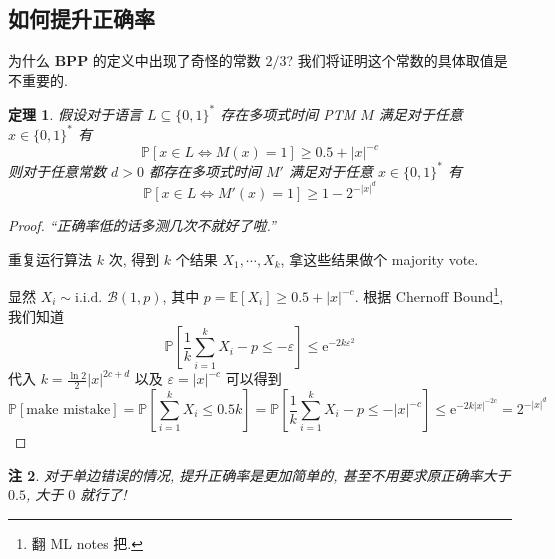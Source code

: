 \documentclass[8pt]{article}
\theoremstyle{compact}
\newtheorem{theorem}{定理}[section]
\newtheorem{remark}[theorem]{注}
\def\le{\leqslant}
\def\ge{\geqslant}
\def\BPP{\textbf{BPP}}
\begin{document}
\subsection{如何提升正确率}
为什么 $\BPP$ 的定义中出现了奇怪的常数 $2/3$? 我们将证明这个常数的具体取值是不重要的.
\begin{theorem}
	假设对于语言 $L \subseteq \{0, 1\}^*$ 存在多项式时间 PTM $M$ 满足对于任意 $x \in \{0, 1\}^*$ 有 $$\mathbb P[x \in L \Leftrightarrow M(x) = 1] \ge 0.5 + |x|^{-c}$$ 则对于任意常数 $d > 0$ 都存在多项式时间 $M'$ 满足对于任意 $x \in \{0, 1\}^*$ 有 $$\mathbb P[x \in L \Leftrightarrow M'(x) = 1] \ge 1 - 2^{-|x|^d}$$
	\label{robustness}
\end{theorem}
\begin{proof}
	\textit{“正确率低的话多测几次不就好了啦.”}

	重复运行算法 $k$ 次, 得到 $k$ 个结果 $X_1, \cdots, X_k$, 拿这些结果做个 majority vote.
	
	显然 $X_i \sim \text{i.i.d. } \mathcal B(1, p)$, 其中 $p = \mathbb E[X_i] \ge 0.5 + |x|^{-c}$. 根据 Chernoff Bound\footnote{翻 ML notes 把.}, 我们知道 $$\mathbb P\left[ \frac{1}{k}\sum_{i=1}^kX_i - p \le -\varepsilon \right] \le \mathrm{e}^{-2k\varepsilon^2}$$ 代入 $k = \frac{\ln 2}{2}|x|^{2c+d}$ 以及 $\varepsilon = |x|^{-c}$ 可以得到 $$\mathbb P[\text{make mistake}] = \mathbb P\left[ \sum_{i=1}^{k}X_i \le 0.5k\right] = \mathbb P\left[ \frac{1}{k}\sum_{i=1}^kX_i - p \le -|x|^{-c} \right] \le \mathrm{e}^{-2k|x|^{-2c}} = 2^{-|x|^d}$$
\end{proof}
\begin{remark}
	对于单边错误的情况, 提升正确率是更加简单的, 甚至不用要求原正确率大于 $0.5$, 大于 $0$ 就行了!
\end{remark}
\end{document}
